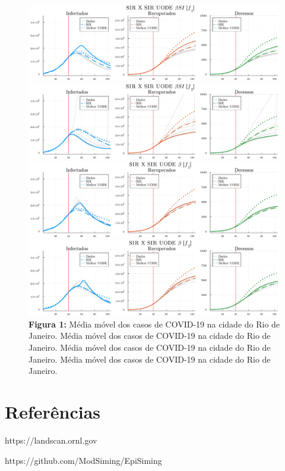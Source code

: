 \documentclass[a4paper,12pt]{article}
\begin{document}
\begin{figure}[h]
	\centering
	\includegraphics[width=1\textwidth]{fit1.pdf}
	\par\vspace{0.1in}
	\includegraphics[width=1\textwidth]{fit2.pdf}
	\par\vspace{0.1in}
	\includegraphics[width=1\textwidth]{fit3.pdf}
	\par\vspace{0.1in}
	\includegraphics[width=1\textwidth]{fit4.pdf}
	
	\caption*{\textbf{Figura 1:} Média móvel dos casos de COVID-19 na cidade do Rio de Janeiro. Média móvel dos casos de COVID-19 na cidade do Rio de Janeiro. Média móvel dos casos de COVID-19 na cidade do Rio de Janeiro. Média móvel dos casos de COVID-19 na cidade do Rio de Janeiro.}
\end{figure}


\section{Referências}

\begin{enumerate}[label={[\arabic*]}]
	\item https://landscan.ornl.gov
	\item https://github.com/ModSiming/EpiSiming
\end{enumerate}
\end{document}
